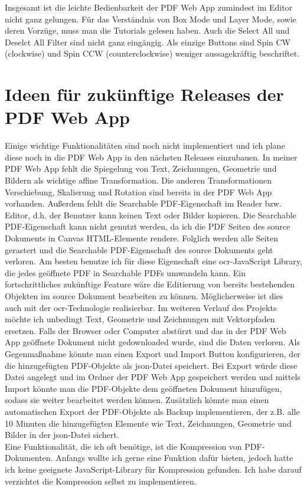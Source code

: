 Insgesamt ist die leichte Bedienbarkeit der PDF Web App zumindest im Editor nicht ganz gelungen. Für das Verständnis von Box Mode und Layer Mode, sowie deren Vorzüge, muss man die Tutorials gelesen haben. Auch die Select All und Deselct All Filter sind nicht ganz eingängig. Als einzige Buttons sind Spin CW (clockwise) und Spin CCW (counterclockwise) weniger aussagekräftig beschriftet.

\section{Ideen für zukünftige Releases der PDF Web App}
Einige wichtige Funktionalitäten sind noch nicht implementiert und ich plane diese noch in die PDF Web App in den nächsten Releases einzubauen. In meiner PDF Web App fehlt die Spiegelung von Text, Zeichnungen, Geometrie und Bildern als wichtige affine Transformation. Die anderen Transformationen Verschiebung, Skalierung und Rotation sind bereits in der PDF Web App vorhanden. Außerdem fehlt die Searchable PDF-Eigenschaft im Reader bzw. Editor, d.h. der Benutzer kann keinen Text oder Bilder kopieren. Die Searchable PDF-Eigenschaft kann nicht genutzt werden, da ich die PDF Seiten des source Dokuments in Canvas HTML-Elemente rendere. Folglich werden alle Seiten gerastert und die Searchable PDF-Eigenschaft des source Dokuments geht verloren. Am besten benutze ich für diese Eigenschaft eine \gls{ocr}-JavaScript Library, die jedes geöffnete PDF in Searchable PDFs umwandeln kann. Ein fortschrittliches zukünftige Feature wäre die Editierung von bereits bestehenden Objekten im source Dokument bearbeiten zu können. Möglicherweise ist dies auch mit der \gls{ocr}-Technologie realisierbar. Im weiteren Verlauf des Projekts möchte ich unbedingt Text, Geometrie und Zeichnungen mit Vektorpfaden ersetzen. Falls der Browser oder Computer abstürzt und das in der PDF Web App geöffnete Dokument nicht gedownloaded wurde, sind die Daten verloren. Als Gegenmaßnahme könnte man einen Export und Import Button konfigurieren, der die hinzugefügten PDF-Objekte als \gls{json}-Datei speichert. Bei Export würde diese Datei angelegt und im Ordner der PDF Web App gespeichert werden und mittels Import könnte man die PDF-Objekte dem geöffneten Dokument hinzufügen, sodass sie weiter bearbeitet werden können. Zusätzlich könnte man einen automatischen Export der PDF-Objekte als Backup implementieren, der z.B. alle 10 Minuten die hinzugefügten Elemente wie Text, Zeichnungen, Geometrie und Bilder in der \gls{json}-Datei sichert. \\
Eine Funktionalität, die ich oft benötige, ist die Kompression von PDF-Dokumenten. Anfangs wollte ich gerne eine Funktion dafür bieten, jedoch hatte ich keine geeignete JavaScript-Library für Kompression gefunden. Ich habe darauf verzichtet die Kompression selbst zu implementieren. 